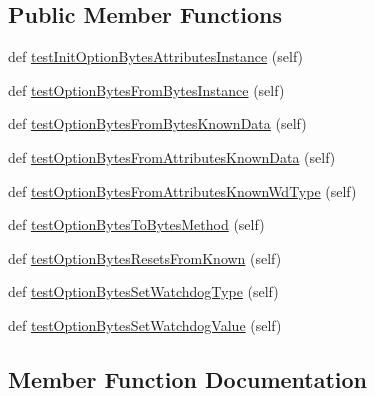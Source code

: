 \subsection*{Public Member Functions}
\begin{DoxyCompactItemize}
\item 
def \hyperlink{classstm__tools_1_1tests_1_1optionbytes__test_1_1OptioByteTestCase_a52f752f675b44f18235b22d6f574b20e}{test\+Init\+Option\+Bytes\+Attributes\+Instance} (self)
\item 
def \hyperlink{classstm__tools_1_1tests_1_1optionbytes__test_1_1OptioByteTestCase_ad4ac0a0181da1c7c9c4d241c5fc0bde7}{test\+Option\+Bytes\+From\+Bytes\+Instance} (self)
\item 
def \hyperlink{classstm__tools_1_1tests_1_1optionbytes__test_1_1OptioByteTestCase_a3ed58e1144f14d84c4f48d12df377b8b}{test\+Option\+Bytes\+From\+Bytes\+Known\+Data} (self)
\item 
def \hyperlink{classstm__tools_1_1tests_1_1optionbytes__test_1_1OptioByteTestCase_a7c06e67facce403071ee83c0f361e267}{test\+Option\+Bytes\+From\+Attributes\+Known\+Data} (self)
\item 
def \hyperlink{classstm__tools_1_1tests_1_1optionbytes__test_1_1OptioByteTestCase_a24a393387e49294471377b6ffcee128c}{test\+Option\+Bytes\+From\+Attributes\+Known\+Wd\+Type} (self)
\item 
def \hyperlink{classstm__tools_1_1tests_1_1optionbytes__test_1_1OptioByteTestCase_a882a59582b3706a59c616a3c4b8b82f3}{test\+Option\+Bytes\+To\+Bytes\+Method} (self)
\item 
def \hyperlink{classstm__tools_1_1tests_1_1optionbytes__test_1_1OptioByteTestCase_a69fff1f9b79505f64406627efa620f18}{test\+Option\+Bytes\+Resets\+From\+Known} (self)
\item 
def \hyperlink{classstm__tools_1_1tests_1_1optionbytes__test_1_1OptioByteTestCase_ac3a105564c93b8b37a961c9486d72e69}{test\+Option\+Bytes\+Set\+Watchdog\+Type} (self)
\item 
def \hyperlink{classstm__tools_1_1tests_1_1optionbytes__test_1_1OptioByteTestCase_a88cf4703aaf92b596cb9100f5dea70a9}{test\+Option\+Bytes\+Set\+Watchdog\+Value} (self)
\end{DoxyCompactItemize}


\subsection{Member Function Documentation}
\mbox{\label{classstm__tools_1_1tests_1_1optionbytes__test_1_1OptioByteTestCase_a52f752f675b44f18235b22d6f574b20e}} 
